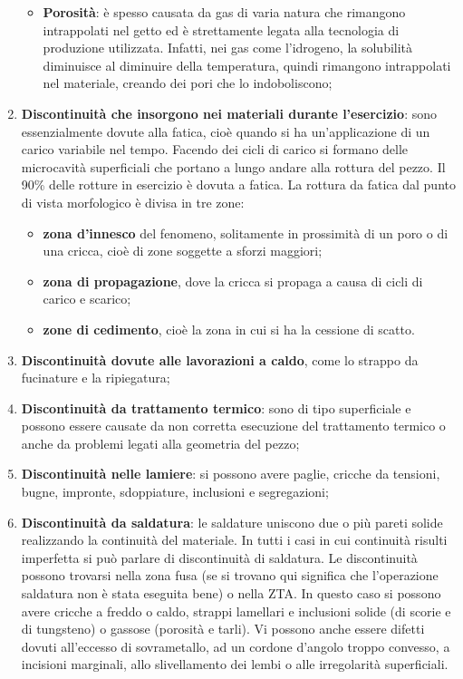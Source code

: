 \begin{enumerate}
\begin{itemize}
        \item \textbf{Porosità}: è spesso causata da gas di varia natura che rimangono intrappolati nel getto ed è strettamente legata alla tecnologia di produzione utilizzata. Infatti, nei gas come l’idrogeno, la solubilità diminuisce al diminuire della temperatura, quindi rimangono intrappolati nel materiale, creando dei pori che lo indoboliscono;
    \end{itemize}
    \item \textbf{Discontinuità che insorgono nei materiali durante l'esercizio}: sono essenzialmente dovute alla fatica, cioè quando si ha un’applicazione di un carico variabile nel tempo. Facendo dei cicli di carico si formano delle microcavità superficiali che portano a lungo andare alla rottura del pezzo. Il 90\% delle rotture in esercizio è dovuta a fatica. La rottura da fatica dal punto di vista morfologico è divisa in tre zone:
    \begin{itemize}
        \item \textbf{zona d'innesco} del fenomeno, solitamente in prossimità di un poro o di una cricca, cioè di zone soggette a sforzi maggiori;
        \item \textbf{zona di propagazione}, dove la cricca si propaga a causa di cicli di carico e scarico;
        \item \textbf{zone di cedimento}, cioè la zona in cui si ha la cessione di scatto.
    \end{itemize}
    \item \textbf{Discontinuità dovute alle lavorazioni a caldo}, come lo strappo da fucinature e la ripiegatura;
    \item \textbf{Discontinuità da trattamento termico}: sono di tipo superficiale e possono essere causate da non corretta esecuzione del trattamento termico o anche da problemi legati alla geometria del pezzo;
    \item \textbf{Discontinuità nelle lamiere}: si possono avere paglie, cricche da tensioni, bugne, impronte, sdoppiature, inclusioni e segregazioni;
    \item \textbf{Discontinuità da saldatura}: le saldature uniscono due o più pareti solide realizzando la continuità del materiale. In tutti i casi in cui continuità risulti imperfetta si può parlare di discontinuità di saldatura. Le discontinuità possono trovarsi nella zona fusa (se si trovano qui significa che l’operazione saldatura non è stata eseguita bene) o nella ZTA. In questo caso si possono avere cricche a freddo o caldo, strappi lamellari e inclusioni solide (di scorie e di tungsteno) o gassose (porosità e tarli). Vi possono anche essere difetti dovuti all’eccesso di sovrametallo, ad un cordone d’angolo troppo convesso, a incisioni marginali, allo slivellamento dei lembi o alle irregolarità superficiali.
\end{enumerate}

